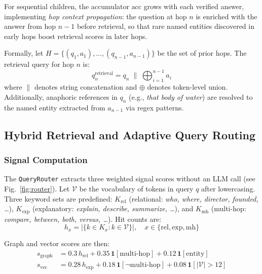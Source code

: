 \documentclass[conference]{IEEEtran}
\begin{document}
For sequential children, the accumulator $\text{acc}$ grows with
each verified answer, implementing \emph{hop context propagation}:
the question at hop $n$ is enriched with the answer from hop $n-1$
before retrieval, so that rare named entities discovered in early hops
boost retrieval scores in later hops.

Formally, let $H = \{(q_1, a_1), \ldots, (q_{n-1}, a_{n-1})\}$ be the
set of prior hops. The retrieval query for hop $n$ is:
\begin{equation}
  q_n^{\text{retrieval}} = q_n \;\|\; \bigoplus_{i=1}^{n-1} a_i
  \label{eq:enrichment}
\end{equation}
where $\|$ denotes string concatenation and $\oplus$ denotes token-level
union.  Additionally, anaphoric references in $q_n$ (e.g., \textit{that
body of water}) are resolved to the named entity extracted from $a_{n-1}$
via regex patterns.

\subsection{Hybrid Retrieval and Adaptive Query Routing}
\label{sec:router}

\subsubsection{Signal Computation}

The \texttt{QueryRouter} extracts three weighted signal scores without
an LLM call (see Fig.~\ref{fig:router}).  Let $\mathcal{V}$ be the vocabulary of tokens in query $q$
after lowercasing.  Three keyword sets are predefined:
$K_{\text{rel}}$ (relational: \textit{who, where, director, founded, \ldots}),
$K_{\text{exp}}$ (explanatory: \textit{explain, describe, summarize, \ldots}),
and $K_{\text{mh}}$ (multi-hop: \textit{compare, between, both, versus,
\ldots}).  Hit counts are:
\begin{equation}
  h_x = |\{k \in K_x : k \in \mathcal{V}\}|, \quad x \in \{\text{rel}, \text{exp}, \text{mh}\}
\end{equation}

Graph and vector scores are then:
\begin{align}
  s_{\text{graph}} &= 0.3\,h_{\text{rel}} + 0.35\,\mathbf{1}[\text{multi-hop}] + 0.12\,\mathbf{1}[\text{entity}] \label{eq:gscore}\\
  s_{\text{vec}}   &= 0.28\,h_{\text{exp}} + 0.18\,\mathbf{1}[\neg\text{multi-hop}] + 0.08\,\mathbf{1}[|\mathcal{V}|>12] \label{eq:vscore}
\end{align}
\end{document}
